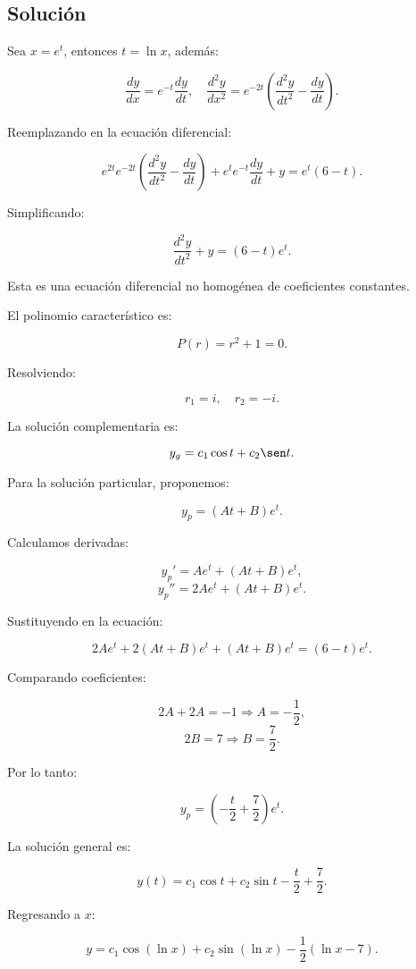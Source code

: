 \documentclass{article}
\begin{document}
\subsection*{Solución}

Sea $x = e^t$, entonces $t = \ln x$, además:

\[
    \frac{dy}{dx} = e^{-t} \frac{dy}{dt}, \quad \frac{d^2 y}{dx^2} = e^{-2t} \left( \frac{d^2 y}{dt^2} - \frac{dy}{dt} \right).
\]

Reemplazando en la ecuación diferencial:

\[
    e^{2t} e^{-2t} \left( \frac{d^2 y}{dt^2} - \frac{dy}{dt} \right) + e^t e^{-t} \frac{dy}{dt} + y = e^t (6 - t).
\]

Simplificando:

\[
    \frac{d^2 y}{dt^2} + y = (6 - t)e^t.
\]

Esta es una ecuación diferencial no homogénea de coeficientes constantes.

El polinomio característico es:

\[
    P(r) = r^2 + 1 = 0.
\]

Resolviendo:

\[
    r_1 = i, \quad r_2 = -i.
\]

La solución complementaria es:

\[
    y_g = c_1 \cos t + c_2 \sen t.
\]

Para la solución particular, proponemos:

\[
    y_p = (At + B)e^t.
\]

Calculamos derivadas:

\[
    y_p' = Ae^t + (At + B)e^t,
\]
\[
    y_p'' = 2Ae^t + (At + B)e^t.
\]

Sustituyendo en la ecuación:

\[
    2Ae^t + 2(At + B)e^t + (At + B)e^t = (6 - t)e^t.
\]

Comparando coeficientes:

\[
    2A + 2A = -1 \Rightarrow A = -\frac{1}{2},
\]
\[
    2B = 7 \Rightarrow B = \frac{7}{2}.
\]

Por lo tanto:

\[
    y_p = \left(-\frac{t}{2} + \frac{7}{2}\right)e^t.
\]

La solución general es:

\[
    y(t) = c_1 \cos t + c_2 \sin t - \frac{t}{2} + \frac{7}{2}.
\]

Regresando a $x$:

\[
    y = c_1 \cos (\ln x) + c_2 \sin (\ln x) - \frac{1}{2} (\ln x - 7).
\]
\end{document}
